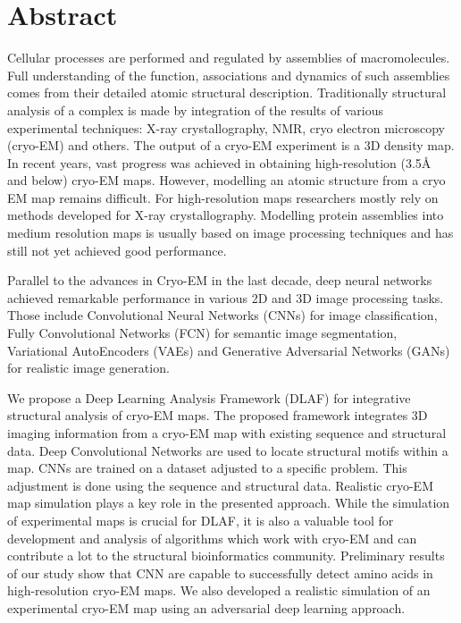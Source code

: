 \section{Abstract}
Cellular processes are performed and regulated by assemblies of macromolecules. 
Full understanding of the function, associations and dynamics of  such
assemblies comes from their detailed atomic structural description. 
Traditionally structural analysis of a complex is made by integration of the results of various experimental techniques: X-ray crystallography, NMR, cryo electron microscopy (cryo-EM)  and others.
The output of a cryo-EM experiment is a 3D density map.
In recent years,  vast progress was achieved in obtaining high-resolution (3.5\AA~ and below) cryo-EM maps.
However,  modelling an atomic structure from a cryo EM  map remains difficult.
For high-resolution maps  researchers mostly rely on
methods developed for X-ray crystallography. 
Modelling protein assemblies into medium resolution maps is usually based on image processing techniques and has still not yet achieved good performance.

Parallel to the advances in Cryo-EM in the last decade, deep neural networks achieved remarkable performance in various 2D and 3D image processing tasks. 
Those include Convolutional Neural Networks (CNNs) for image classification, Fully Convolutional Networks (FCN) for semantic image segmentation, Variational AutoEncoders (VAEs) and Generative Adversarial Networks (GANs) for realistic image generation.

We propose a Deep Learning Analysis Framework (DLAF) for integrative structural analysis of cryo-EM maps.
The proposed framework integrates 3D imaging information from a cryo-EM map with existing sequence and structural data.
Deep Convolutional Networks  are used to locate structural motifs within a map.
CNNs are trained on a dataset adjusted to a specific problem.
This adjustment is  done using the sequence and structural data.
Realistic cryo-EM map simulation plays a key role in the presented approach.
While the simulation of experimental maps is crucial for DLAF, it is also a valuable tool for development and analysis of algorithms which work with cryo-EM and can contribute a lot to the structural bioinformatics community.
Preliminary results of our study show that CNN are capable to successfully detect amino acids in high-resolution cryo-EM maps.
We also developed a realistic simulation of an experimental cryo-EM map using an adversarial deep learning approach.